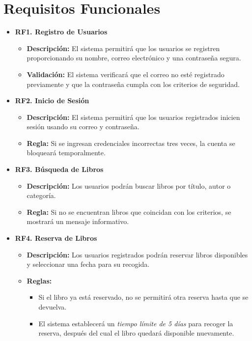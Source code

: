 \documentclass{scrreprt}
\begin{document}
\chapter{Requisitos Funcionales}
\begin{itemize}
    \item \textbf{RF1. Registro de Usuarios}
    \begin{itemize}
        \item \textbf{Descripción:} El sistema permitirá que los usuarios se registren proporcionando su nombre, correo electrónico y una contraseña segura.
        \item \textbf{Validación:} El sistema verificará que el correo no esté registrado previamente y que la contraseña cumpla con los criterios de seguridad.
    \end{itemize}
    \item \textbf{RF2. Inicio de Sesión}
    \begin{itemize}
        \item \textbf{Descripción:} El sistema permitirá que los usuarios registrados inicien sesión usando su correo y contraseña.
        \item \textbf{Regla:} Si se ingresan credenciales incorrectas tres veces, la cuenta se bloqueará temporalmente.
    \end{itemize}
    \item \textbf{RF3. Búsqueda de Libros}
    \begin{itemize}
        \item \textbf{Descripción:} Los usuarios podrán buscar libros por título, autor o categoría.
        \item \textbf{Regla:} Si no se encuentran libros que coincidan con los criterios, se mostrará un mensaje informativo.
    \end{itemize}
    \item \textbf{RF4. Reserva de Libros}
    \begin{itemize}
        \item \textbf{Descripción:} Los usuarios registrados podrán reservar libros disponibles y seleccionar una fecha para su recogida.
        \item \textbf{Reglas:}
        \begin{itemize}
            \item Si el libro ya está reservado, no se permitirá otra reserva hasta que se devuelva.
            \item El sistema establecerá un \textit{tiempo límite de 5 días} para recoger la reserva, después del cual el libro quedará disponible nuevamente.

\end{itemize}
\end{itemize}
\end{itemize}
\end{document}
